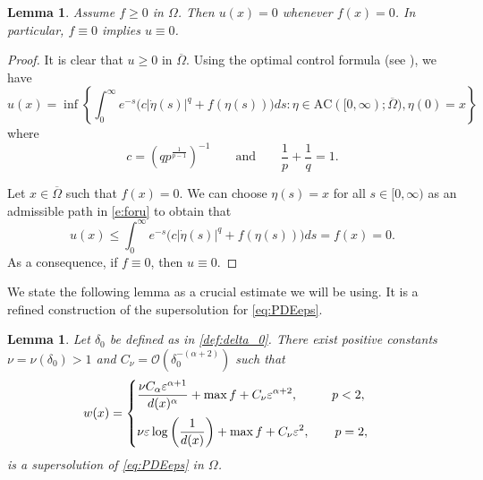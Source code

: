 \documentclass[11pt,reqno]{amsart}
\numberwithin{figure}{section}
\theoremstyle{plain}
\newtheorem{lem}[thm]{Lemma}
\theoremstyle{remark}
\numberwithin{equation}{section}
\begin{document}
\begin{lem}\label{lem:f=0} Assume $f\geq 0$ in $\Omega$. Then $u(x) = 0$ whenever $f(x) = 0$. In particular, $f \equiv 0$ implies $u \equiv 0$.
\end{lem}
\begin{proof} It is clear that $u\geq 0$ in $\overline{\Omega}$. Using the optimal control formula (see \cite{Bardi1997,tran_hamilton-jacobi_2021}), we have
\begin{equation}\label{e:foru}
    u(x) = \inf \left\lbrace \int_0^\infty e^{-  s}\Big(c|\dot{\eta}(s)|^{q} +f(\eta(s))\Big)ds: \eta\in \mathrm{AC}([0,\infty);\overline{\Omega}), \eta(0) = x\right\rbrace
\end{equation}
where 
\begin{equation*}
    c = \left(qp^\frac{1}{p-1}\right)^{-1} \qquad\text{and}\qquad \frac{1}{p} + \frac{1}{q} = 1.
\end{equation*}


Let $x\in \overline{\Omega}$ such that $f(x) = 0$. We can choose $\eta(s) = x$ for all $s\in [0,\infty)$ as an admissible path in \eqref{e:foru} to obtain that
\begin{equation*}
    u(x) \leq  \int_0^\infty e^{-  s}\Big(c|\dot{\eta}(s)|^{q} +f(\eta(s))\Big)ds = f(x) =  0.
\end{equation*}
As a consequence, if $f\equiv 0$, then $u\equiv 0$.
\end{proof}
\noindent We state the following lemma as a crucial estimate we will be using. It is a refined construction of the supersolution for \eqref{eq:PDEeps}.
\begin{lem}\label{lem:super_refined} Let $\delta_0$ be defined as in \eqref{def:delta_0}. There exist positive constants $\nu = \nu(\delta_0)> 1$ and $C_\nu =\mathcal{O}\left(\delta_0^{-(\alpha+2)}\right)$ such that
\begin{equation}\label{e:superwa}
w(x) = \begin{cases}
    \displaystyle\frac{\nu C_\alpha \varepsilon^{\alpha+1}}{d(x)^\alpha} + \max f + C_\nu \varepsilon^{\alpha+2}, \qquad\;\;\,  p<2,\vspace{0.2cm}\\
    \displaystyle\nu \varepsilon \log\left(\frac{1}{d(x)}\right) + \max f+ C_\nu \varepsilon^2, \qquad  p=2,
\end{cases}
\end{equation}
is a supersolution of \eqref{eq:PDEeps} in $\Omega$. 
\end{lem}
\end{document}
